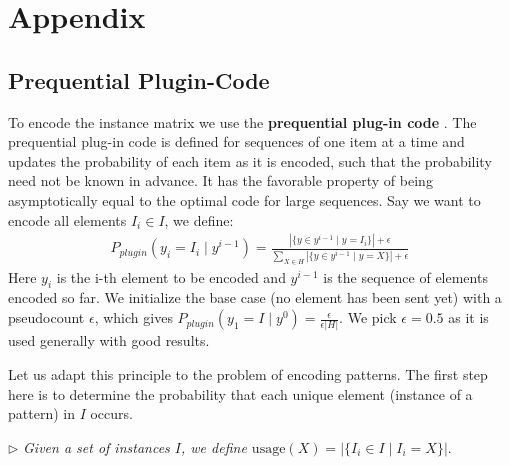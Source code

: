 \documentclass{llncs}
\begin{document}
\section{Appendix}
\label{appendix_a}
\subsection{Prequential Plugin-Code}

To encode the instance matrix we use the \textbf{prequential plug-in code} \cite{ppcode}. The prequential plug-in code is defined for sequences of one item at a time and updates the probability of each item as it is encoded, such that the probability need not be known in advance. It has the favorable property of being asymptotically equal to the optimal code for large sequences. Say we want to encode all elements ${I}_i \in {I}$, we define:
\begin{align}
P_{plugin}( y_i = {I}_i \mid y^{i-1} ) = \frac{|\{y \in y^{i-1} \mid y = {I}_i\}| + \epsilon }{\sum_{X \in H}|\{y \in y^{i-1} \mid y = X\}| + \epsilon}
\end{align}
Here $y_i$ is the i-th element to be encoded and $y^{i-1}$ is the sequence of elements encoded so far. We initialize the base case (no element has been sent yet) with a pseudocount $\epsilon$, which gives $P_{plugin}( y_1 = {I} \mid y^{0} ) = \frac{\epsilon}{\epsilon|H|}$. We pick $\epsilon=0.5$ as it is used generally with good results.

Let us adapt this principle to the problem of encoding patterns. The first step here is to determine the probability that each unique element (instance of a pattern) in ${I}$ occurs. 

\label{usage}
\smallskip \noindent $\triangleright$
\emph{Given a set of instances ${I}$, we define $\mathrm{usage}(X) = |\{ {I}_i \in {I} \mid {I}_i = X\}|.$}
\smallskip
\end{document}
